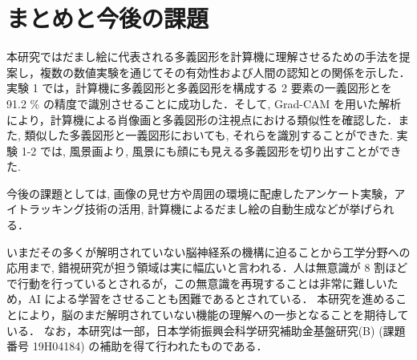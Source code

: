 \documentclass[twocolumn]{jarticle}     %
\newcommand{\1}{\mbox{1}\hspace{-0.25em}\mbox{l}}
\begin{document}
\section{まとめと今後の課題}
\label{sec:conclusion}
本研究ではだまし絵に代表される多義図形を計算機に理解させるための手法を提案し，複数の数値実験を通じてその有効性および人間の認知との関係を示した．
実験 1 では，計算機に多義図形と多義図形を構成する 2 要素の一義図形とを 91.2 \% の精度で識別させることに成功した．そして, Grad-CAM を用いた解析により，計算機による肖像画と多義図形の注視点における類似性を確認した．また, 類似した多義図形と一義図形においても, それらを識別することができた. 実験 1-2 では, 風景画より, 風景にも顔にも見える多義図形を切り出すことができた.\par
今後の課題としては, 画像の見せ方や周囲の環境に配慮したアンケート実験，アイトラッキング技術の活用, 計算機によるだまし絵の自動生成などが挙げられる．\par
いまだその多くが解明されていない脳神経系の機構に迫ることから工学分野への応用まで, 錯視研究が担う領域は実に幅広いと言われる．人は無意識が 8 割ほどで行動を行っているとされるが，この無意識を再現することは非常に難しいため，AI による学習をさせることも困難であるとされている．
本研究を進めることにより，脳のまだ解明されていない機能の理解への一歩となることを期待している．
なお，本研究は一部，日本学術振興会科学研究補助金基盤研究(B) (課題番号 19H04184) の補助を得て行われたものである．





\end{document}
